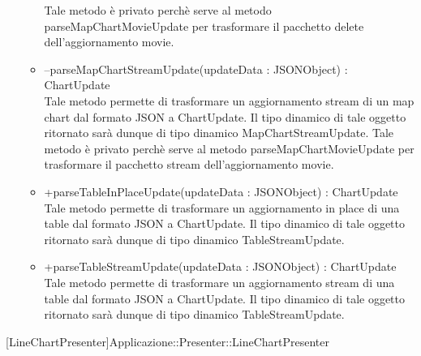 \begin{itemize}
\begin{itemize}
Tale metodo è privato perchè serve al metodo parseMapChartMovieUpdate per trasformare il pacchetto delete dell'aggiornamento movie.
					\item[\ding{111}] {{--parseMapChartStreamUpdate(updateData : JSONObject) : ChartUpdate}} \\ [1mm] Tale metodo permette di trasformare un aggiornamento stream di un map chart dal formato JSON a ChartUpdate. Il tipo dinamico di tale oggetto ritornato sarà dunque di tipo dinamico MapChartStreamUpdate.
Tale metodo è privato perchè serve al metodo parseMapChartMovieUpdate per trasformare il pacchetto stream dell'aggiornamento movie.
					\item[\ding{111}] {{+parseTableInPlaceUpdate(updateData : JSONObject) : ChartUpdate}} \\ [1mm] Tale metodo permette di trasformare un aggiornamento in place di una table dal formato JSON a ChartUpdate. Il tipo dinamico di tale oggetto ritornato sarà dunque di tipo dinamico TableStreamUpdate.
					\item[\ding{111}] {{+parseTableStreamUpdate(updateData : JSONObject) : ChartUpdate}} \\ [1mm] Tale metodo permette di trasformare un aggiornamento stream di una table dal formato JSON a ChartUpdate. Il tipo dinamico di tale oggetto ritornato sarà dunque di tipo dinamico TableStreamUpdate.
				\end{itemize}
		
			\end{itemize}

			
			[LineChartPresenter]{Applicazione::Presenter::LineChartPresenter}
			

	
